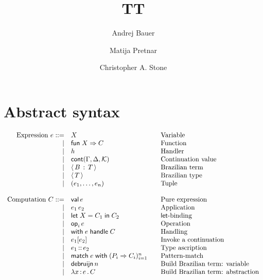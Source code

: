 \documentclass{article}
\newcommand{\G}{\Gamma}
\newcommand{\D}{\Delta}
\newcommand{\bnf}{\mathrel{{:}{:}{=}}}
\newcommand{\bnfor}{|}
\newcommand{\x}{x}     %
\newcommand{\C}{C}     %
\newcommand{\X}{X}     %
\newcommand{\e}{e}     %
\newcommand{\rgn}{r}   %
\newcommand{\T}{T}     %
\newcommand{\B}{B}     %
\newcommand{\KK}{{\cal K}} %
\newcommand{\val}{\mathsf{val}\,} %
\newcommand{\letin}[1]{\mathsf{let}\; #1 \;\mathsf{in}\;} %
\newcommand{\opOp}[2][i]{\mathsf{op}_{#1}\,#2} %
\newcommand{\withhandle}[1]{\mathsf{with}\;#1\;\mathsf{handle}\;} %
\newcommand{\abs}[1]{\mathsf{abs}\;#1\;\mathsf{in}\;} %
\newcommand{\new}[2]{\mathsf{new}(#1,#2)} %
\newcommand{\fun}[1]{\mathsf{fun}\;#1\Rightarrow} %
\newcommand{\app}[2]{#1\,#2} %
\newcommand{\lam}[2]{\lambda #1 \,{:}\, #2 \,.\,} %
\newcommand{\kapp}[2]{#1{}[#2]} %
\newcommand{\bterm}[2]{\langle\,#1\, :\, #2\,\rangle} %
\newcommand{\bty}[1]{\langle\,#1\,\rangle} %
\newcommand{\debruijn}[1]{\mathsf{debruijn}\,#1} %
\newcommand{\cont}[2][\G,\D]{\mathsf{cont}(#1,#2)}     %
\newcommand{\tuple}[1]{(#1)}
\newcommand{\generictuple}[1][n]{\tuple{e_1,\ldots,\e_{#1}}}
\newcommand{\pat}{P}
\newcommand{\match}[2]{\mathsf{match}\; #1\; \mathsf{with}\;#2}
\newcommand{\genericPats}[1][n]{(\pat_i \Rightarrow \C_i)_{i=1}^n}
\newcommand{\genericmatch}[1][\e]{\match{#1}{\genericPats}}
\newcommand{\ascribe}[2]{#1 \,{:}{:}\, #2} %
\begin{document}
\title{TT}
\author{Andrej Bauer \and Matija Pretnar \and Christopher A. Stone}
\maketitle

\section{Abstract syntax}
\label{sec:abstract-syntax}

\begin{equation*}
  \begin{array}{rl@{\qquad}l}
  \text{Expression $\e$}
    \bnf    & \X          & \text{Variable} \\
    \bnfor  & \fun{\X} \C  & \text{Function} \\
    \bnfor  & h           & \text{Handler} \\
    \bnfor  & \cont{\KK} & \text{Continuation value} \\
    \bnfor  & \bterm{\B}{\T}           & \text{Brazilian term} \\
    \bnfor  & \bty{\T}           & \text{Brazilian type} \\
    \bnfor  & \generictuple   & \text{Tuple}\\
    \\
    \text{Computation $\C$}
      \bnf  & \val \e                & \text{Pure expression} \\
    \bnfor  & \app{\e_1}{\e_2}   & \text{Application} \\
    \bnfor  & \letin{\X = \C_1} \C_2  & \text{$\mathsf{let}$-binding} \\
    \bnfor  & \opOp{\e} & \text{Operation} \\
    \bnfor  & \withhandle{\e} \C & \text{Handling} \\
    \bnfor  & \kapp{\e_1}{\e_2}   & \text{Invoke a continuation} \\
    \bnfor  & \ascribe{\e_1}{\e_2} & \text{Type ascription} \\
    \bnfor  & \genericmatch& \text{Pattern-match}\\
    \bnfor  & \debruijn{n} & \text{Build Brazilian term: variable} \\
    \bnfor  & \lam{\x}{\e} \C   & \text{Build Brazilian term: abstraction} \\

\end{array}
\end{equation*}
\end{document}

